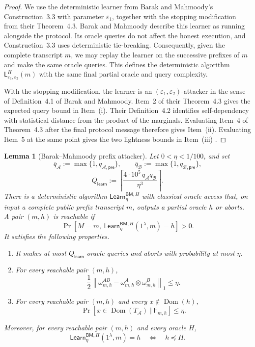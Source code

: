 \documentclass[11pt]{article}
\newcounter{algorithm}
\newtheorem{lemma}[lemma]{Lemma}
\newcommand{\cA}{\mathcal{A}}
\newcommand{\cB}{\mathcal{B}}
\newcommand{\Dom}{\operatorname{Dom}}
\newcommand{\Learn}{\mathsf{Learn}}
\begin{document}
\begin{proof}
We use the deterministic learner from Barak and Mahmoody's
Construction~3.3 with parameter $\varepsilon_1$, together with the stopping
modification from their Theorem~4.3.  Barak and Mahmoody describe this learner
as running alongside the protocol.  Its oracle queries do not affect the
honest execution, and Construction~3.3 uses deterministic tie-breaking.
Consequently, given the complete transcript $m$, we may replay the learner on
the successive prefixes of $m$ and make the same oracle queries.  This defines
the deterministic algorithm $\mathsf L^H_{\varepsilon_1,\varepsilon_2}(m)$
with the same final partial oracle and query complexity.

With the stopping modification, the learner is an
$(\varepsilon_1,\varepsilon_2)$-attacker in the sense of Definition~4.1 of
Barak and Mahmoody.  Item~2 of their Theorem~4.3 gives the expected query
bound in Item~\textup{(i)}.  Their Definition~4.2 identifies self-dependency
with statistical distance from the product of the marginals.  Evaluating
Item~4 of Theorem~4.3 after the final protocol message therefore gives
Item~\textup{(ii)}.  Evaluating Item~5 at the same point gives the two
lightness bounds in Item~\textup{(iii)}
\cite[Construction~3.3, Definitions~4.1--4.2, and Theorem~4.3,
Items~2, 4, and~5]{BarakMahmoodyFull}.
\end{proof}

\begin{lemma}[Barak--Mahmoody prefix attacker]
\label{lem:multi-independence-attacker}
Let $0<\eta<1/100$, and set
\[
  \bar q_{\cA}:=\max\{1,q_{\cA,\mathsf{pre}}\},
  \qquad
  \bar q_{\cB}:=\max\{1,q_{\cB,\mathsf{pre}}\},
\]
\[
  Q_{\mathsf{learn}}
  :=
  \left\lceil
    \frac{4\cdot 10^5\,\bar q_{\cA}\bar q_{\cB}}{\eta^3}
  \right\rceil.
\]
There is a deterministic algorithm
$\Learn^{\mathsf{BM},H}_\eta$ with classical oracle access that, on input a
complete public prefix transcript $m$, outputs a partial oracle $h$ or aborts.
A pair $(m,h)$ is \emph{reachable} if
\[
  \Pr\!\left[
    M=m,\
    \Learn^{\mathsf{BM},H}_\eta(1^\lambda,m)=h
  \right]>0.
\]
It satisfies the following properties.
\begin{enumerate}[leftmargin=2em,label=\textup{(\roman*)}]
  \item It makes at most $Q_{\mathsf{learn}}$ oracle queries and aborts with
  probability at most $\eta$.

  \item For every reachable pair $(m,h)$,
  \[
    \frac12
    \left\|
      \omega^{AB}_{m,h}
      -
      \omega^A_{m,h}\otimes\omega^B_{m,h}
    \right\|_1
    \le\eta.
  \]

  \item For every reachable pair $(m,h)$ and every $x\notin\Dom(h)$,
  \[
    \Pr[x\in\Dom(T_{\cA})\mid\mathsf F_{m,h}]
    \le\eta.
  \]
\end{enumerate}
Moreover, for every reachable pair $(m,h)$ and every oracle $H$,
\[
  \Learn^{\mathsf{BM},H}_\eta(1^\lambda,m)=h
  \quad\Longleftrightarrow\quad
  h\preceq H.
\]
\end{lemma}
\end{document}
